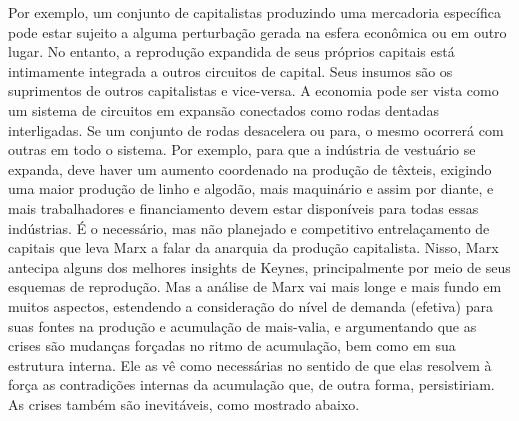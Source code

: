 Por exemplo, um conjunto de capitalistas produzindo uma mercadoria específica pode estar sujeito a alguma perturbação gerada na esfera econômica ou em outro lugar. No entanto, a reprodução expandida de seus próprios capitais está intimamente integrada a outros circuitos de capital. Seus insumos são os suprimentos de outros capitalistas e vice-versa. A economia pode ser vista como um sistema de circuitos em expansão conectados como rodas dentadas interligadas. Se um conjunto de rodas desacelera ou para, o mesmo ocorrerá com outras em todo o sistema. Por exemplo, para que a indústria de vestuário se expanda, deve haver um aumento coordenado na produção de têxteis, exigindo uma maior produção de linho e algodão, mais maquinário e assim por diante, e mais trabalhadores e financiamento devem estar disponíveis para todas essas indústrias. É o necessário, mas não planejado e competitivo entrelaçamento de capitais que leva Marx a falar da anarquia da produção capitalista. Nisso, Marx antecipa alguns dos melhores insights de Keynes, principalmente por meio de seus esquemas de reprodução. Mas a análise de Marx vai mais longe e mais fundo em muitos aspectos, estendendo a consideração do nível de demanda (efetiva) para suas fontes na produção e acumulação de mais-valia, e argumentando que as crises são mudanças forçadas no ritmo de acumulação, bem como em sua estrutura interna. Ele as vê como necessárias no sentido de que elas resolvem à força as contradições internas da acumulação que, de outra forma, persistiriam. As crises também são inevitáveis, como mostrado abaixo.
 \par 
